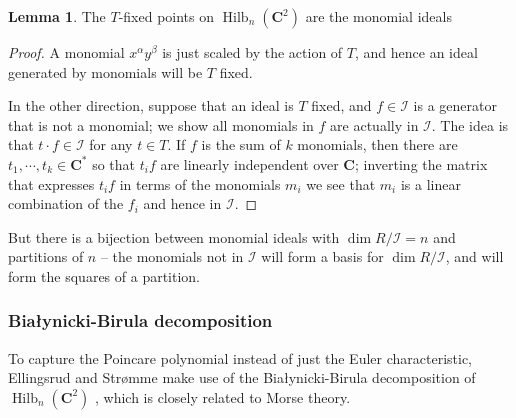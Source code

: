 \documentclass{amsart}[12pt]
\theoremstyle{definition}
\newtheorem{lemma}[dummy]{Lemma}
\newcommand{\C}{\mathbf{C}}
\DeclareMathOperator{\Hilb}{Hilb}
\begin{document}
\begin{lemma}
The $T$-fixed points on $\Hilb_n(\C^2)$ are the monomial ideals
\end{lemma}

\begin{proof}
A monomial $x^\alpha y^\beta$ is just scaled by the action of $T$, and hence an ideal generated by monomials will be $T$ fixed.  

In the other direction, suppose that an ideal is $T$ fixed, and $f\in\mathcal{I}$ is a generator that is not a monomial; we show all monomials in $f$ are actually in $\mathcal{I}$.  The idea is that $t\cdot f\in\mathcal{I}$ for any $t\in T$.  If $f$ is the sum of $k$ monomials, then there are $t_1,\cdots, t_k\in\C^*$ so that $t_i f$ are linearly independent over $\C$; inverting the matrix that expresses $t_i f$ in terms of the monomials $m_i$ we see that $m_i$ is a linear combination of the $f_i$ and hence in $\mathcal{I}$.
\end{proof}

But there is a bijection between monomial ideals with $\dim R/\mathcal{I}=n$ and partitions of $n$ -- the monomials not in $\mathcal{I}$ will form a basis for $\dim R/\mathcal{I}$, and will form the squares of a partition.

\begin{center}
\end{center}





\subsubsection{Bia\l ynicki-Birula decomposition}

To capture the Poincare polynomial instead of just the Euler characteristic, Ellingsrud and Str\o mme make use of the Bia\l ynicki-Birula decomposition of $\Hilb_n(\C^2)$ \cite{BB}, which is closely related to Morse theory. 
\end{document}
